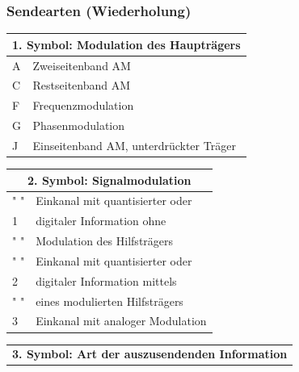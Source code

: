 \begin{frame}
  \frametitle{Sendearten (Wiederholung)}
  \begin{tiny}
    \begin{minipage}{\textwidth}

      \begin{minipage}{0.4\textwidth}
        \begin{tabular}{|l|l|}
          \hline
          \multicolumn{2}{|c|}{\textbf{1. Symbol: Modulation des Haupträgers}}\\
          \hline
          A & Zweiseitenband AM \\ \hline
          C & Restseitenband AM  \\ \hline
          F & Frequenzmodulation  \\
          G & Phasenmodulation\\ \hline
          J & Einseitenband AM, unterdrückter Träger\\ \hline
        \end{tabular}
      \end{minipage}
      \hspace{1cm}
      \begin{minipage}{0.4\textwidth}
        \begin{tabular}{|l|l|}
          \hline
          \multicolumn{2}{|c|}{\textbf{2. Symbol: Signalmodulation}}\\
          \hline
          " " & Einkanal mit quantisierter oder \\
          1  & digitaler Information ohne \\
          " " & Modulation des Hilfsträgers \\ \hline
          " " & Einkanal mit quantisierter oder\\
          2  & digitaler Information mittels \\
          " " & eines modulierten Hilfsträgers \\ \hline
          3  & Einkanal mit analoger Modulation  \\ \hline
        \end{tabular}
      \end{minipage}
    \end{minipage}
    \vspace{0.5cm}
    \begin{minipage}{0.4\textwidth}
      \begin{tabular}{|l|l|}
        \hline
        \multicolumn{2}{|c|}{\textbf{3. Symbol: Art der auszusendenden Information}}\\

\end{tabular}
\end{minipage}
\end{tiny}
\end{frame}
